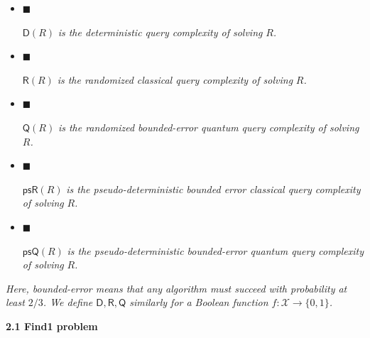 \begin{itemize}


\item[] 
$\blacksquare$ 


$\mathsf{D}({R})$\emph{ is the deterministic query complexity of solving }${R}$\emph{.}\par





\item[] 
$\blacksquare$ 


$\mathsf{R}({R})$\emph{ is the randomized classical query complexity of solving }${R}$\emph{.}\par





\item[] 
$\blacksquare$ 


$\mathsf{Q}({R})$\emph{ is the randomized bounded-error quantum query complexity of solving }${R}$\emph{.}\par





\item[] 
$\blacksquare$ 


$\mathsf{psR}(R)$\emph{ is the pseudo-deterministic bounded error classical query complexity of solving }${R}$\emph{.}\par





\item[] 
$\blacksquare$ 


$\mathsf{psQ}({R})$\emph{ is the pseudo-deterministic bounded-error quantum query complexity of solving }${R}$\emph{.}\par





\end{itemize}


\emph{Here, bounded-error means that any algorithm must succeed with probability at least $2/3$. We define $\mathsf{D},\mathsf{R},\mathsf{Q}$ similarly for a Boolean function $f:\mathcal{X}\rightarrow\{0,1\}$.}\par






\par\medskip\noindent\textbf{
2.1 Find1 problem}\par




